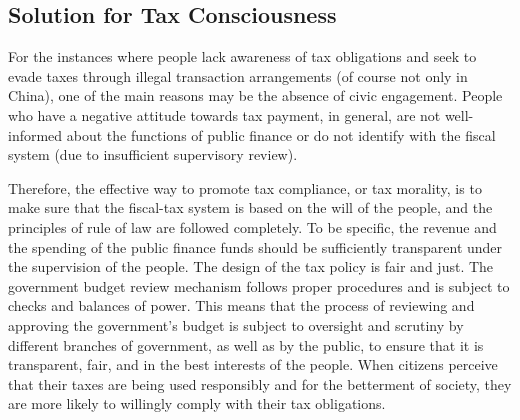 \documentclass[]{article}
\begin{document}











\subsection{Solution for Tax Consciousness}

For the instances where people lack awareness of tax obligations and seek to evade taxes through illegal transaction arrangements (of course not only in China), one of the main reasons may be the absence of civic engagement. People who have a negative attitude towards tax payment, in general, are not well-informed about the functions of public finance or do not identify with the fiscal system (due to insufficient supervisory review).

Therefore, the effective way to promote tax compliance, or tax morality, is to make sure that the fiscal-tax system is based on the will of the people, and the principles of rule of law are followed completely. To be specific, the revenue and the spending of the public finance funds should be sufficiently transparent under the supervision of the people. The design of the tax policy is fair and just. The government budget review mechanism follows proper procedures and is subject to checks and balances of power. This means that the process of reviewing and approving the government’s budget is subject to oversight and scrutiny by different branches of government, as well as by the public, to ensure that it is transparent, fair, and in the best interests of the people. 
When citizens perceive that their taxes are being used responsibly and for the betterment of society, they are more likely to willingly comply with their tax obligations.
\end{document}
